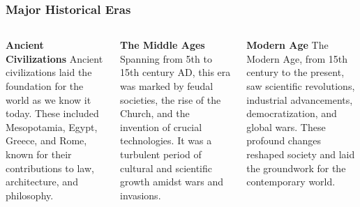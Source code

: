 \documentclass[5pt]{beamer}
\begin{document}
\begin{frame}
\frametitle{Major Historical Eras}
\begin{columns}
\begin{column}{0.3\textwidth}
\begin{block}{\textbf{Ancient Civilizations}}
Ancient civilizations laid the foundation for the world as we know it today. These included Mesopotamia, Egypt, Greece, and Rome, known for their contributions to law, architecture, and philosophy.
\end{block}
\end{column}
\begin{column}{0.3\textwidth}
\begin{block}{\textbf{The Middle Ages}}
Spanning from 5th to 15th century AD, this era was marked by feudal societies, the rise of the Church, and the invention of crucial technologies. It was a turbulent period of cultural and scientific growth amidst wars and invasions.
\end{block}
\end{column}
\begin{column}{0.3\textwidth}
\begin{block}{\textbf{Modern Age}}
The Modern Age, from 15th century to the present, saw scientific revolutions, industrial advancements, democratization, and global wars. These profound changes reshaped society and laid the groundwork for the contemporary world.
\end{block}
\end{column}
\end{columns}
\end{frame}
\end{document}
